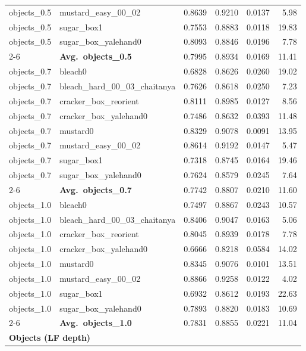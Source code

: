 \begin{longtable}{llrrrr}
  objects_0.5 & mustard\_easy\_00\_02 & 0.8639 & 0.9210 & 0.0137 & 5.98 \\
  objects_0.5 & sugar\_box1 & 0.7553 & 0.8883 & 0.0118 & 19.83 \\
  objects_0.5 & sugar\_box\_yalehand0 & 0.8093 & 0.8846 & 0.0196 & 7.78 \\
  \cmidrule{2-6}
  & \textbf{Avg.~objects_0.5} & 0.7995 & 0.8934 & 0.0169 & 11.41 \\
  \midrule
  objects_0.7 & bleach0 & 0.6828 & 0.8626 & 0.0260 & 19.02 \\
  objects_0.7 & bleach\_hard\_00\_03\_chaitanya & 0.7626 & 0.8618 & 0.0250 & 7.23 \\
  objects_0.7 & cracker\_box\_reorient & 0.8111 & 0.8985 & 0.0127 & 8.56 \\
  objects_0.7 & cracker\_box\_yalehand0 & 0.7486 & 0.8632 & 0.0393 & 11.48 \\
  objects_0.7 & mustard0 & 0.8329 & 0.9078 & 0.0091 & 13.95 \\
  objects_0.7 & mustard\_easy\_00\_02 & 0.8614 & 0.9192 & 0.0147 & 5.47 \\
  objects_0.7 & sugar\_box1 & 0.7318 & 0.8745 & 0.0164 & 19.46 \\
  objects_0.7 & sugar\_box\_yalehand0 & 0.7624 & 0.8579 & 0.0245 & 7.64 \\
  \cmidrule{2-6}
  & \textbf{Avg.~objects_0.7} & 0.7742 & 0.8807 & 0.0210 & 11.60 \\
  \midrule
  objects_1.0 & bleach0 & 0.7497 & 0.8867 & 0.0243 & 10.57 \\
  objects_1.0 & bleach\_hard\_00\_03\_chaitanya & 0.8406 & 0.9047 & 0.0163 & 5.06 \\
  objects_1.0 & cracker\_box\_reorient & 0.8045 & 0.8939 & 0.0178 & 7.78 \\
  objects_1.0 & cracker\_box\_yalehand0 & 0.6666 & 0.8218 & 0.0584 & 14.02 \\
  objects_1.0 & mustard0 & 0.8345 & 0.9076 & 0.0101 & 13.51 \\
  objects_1.0 & mustard\_easy\_00\_02 & 0.8866 & 0.9258 & 0.0122 & 4.02 \\
  objects_1.0 & sugar\_box1 & 0.6932 & 0.8612 & 0.0193 & 22.63 \\
  objects_1.0 & sugar\_box\_yalehand0 & 0.7893 & 0.8820 & 0.0183 & 10.69 \\
  \cmidrule{2-6}
  & \textbf{Avg.~objects_1.0} & 0.7831 & 0.8855 & 0.0221 & 11.04 \\
  \midrule
\multicolumn{6}{l}{\textbf{Objects (LF depth)}} \\

\end{longtable}
